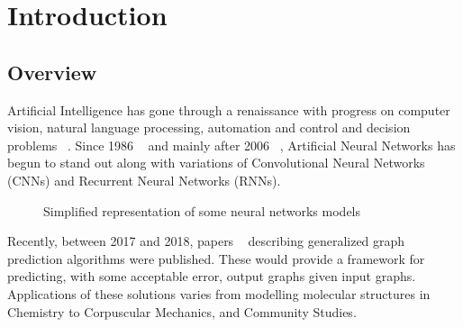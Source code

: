 \section{Introduction}

\subsection{Overview}
Artificial Intelligence has gone through a renaissance with progress on computer vision, natural language processing, automation and control and decision problems ~\cite{Battaglia_2018}. Since 1986 ~\cite{Rumelhart_1986} and mainly after 2006 ~\cite{Hinton_2006}, Artificial Neural Networks has begun to stand out along with variations of Convolutional Neural Networks (CNNs) and Recurrent Neural Networks (RNNs).


\begin{figure}[!htb]
\centering
{}
\caption{Simplified representation of some neural networks models ~\cite{Battaglia_2018}}

\label{fig:simple_neural_network}
\end{figure}

Recently, between 2017 and 2018, papers ~\cite{Battaglia_2018, Gilmer_2017, Wang_2018} describing generalized graph prediction algorithms were published. These would provide a framework for predicting, with some acceptable error, output graphs given input graphs. Applications of these solutions varies from modelling molecular structures in Chemistry to Corpuscular Mechanics, and Community Studies.

